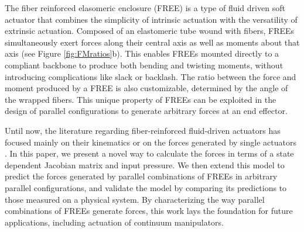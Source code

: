 The fiber reinforced elasomeric enclosure (FREE) is a type of fluid driven soft actuator that combines the simplicity of intrinsic actuation with the versatility of extrinsic actuation. Composed of an elastomeric tube wound with fibers, FREEs simultaneously exert forces along their central axis as well as moments about that axis \cite{bishop2015design} (see Figure \ref{fig:FMratios}b). This enables FREEs mounted directly to a compliant backbone to produce both bending and twisting moments, without introducing complications like slack or backlash.  The ratio between the force and moment produced by a FREE is also customizable, determined by the angle of the wrapped fibers. This unique property of FREEs can be exploited in the design of parallel configurations to generate arbitrary forces at an end effector.



Until now, the literature regarding fiber-reinforced fluid-driven actuators has focused mainly on their kinematics \cite{bishop2015design, bishop2012parallel, connolly2015mechanical} or on the forces generated by single actuators \cite{bruder2017model, sedal2017constitutive}. In this paper, we present a novel way to calculate the forces in terms of a state dependent Jacobian matrix and input pressure. We then extend this model to predict the forces generated by parallel combinations of FREEs in arbitrary parallel configurations, and validate the model by comparing its predictions to those measured on a physical system. By characterizing the way parallel combinations of FREEs generate forces, this work lays the foundation for future applications, including actuation of continuum manipulators.



